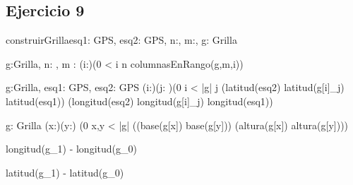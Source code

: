 \documentclass[a4paper]{article}
\begin{document}
\subsection*{Ejercicio 9}
\begin{proc}{construirGrilla}{\In esq1: GPS, \In esq2: GPS, \In n:\ent, \In m:\ent, \Out g: Grilla}{}
    
     {g:Grilla, n: \ent, m :\ent} {
		(\forall i:\ent)(0 < i \leq n \implicaLuego columnasEnRango(g,m,i))
    }
		
    
     {g:Grilla, esq1: GPS, esq2: GPS}{
		(\forall i:\ent)(\forall j: \ent)(0 \leq i < |g|  \leq j  \implicaLuego (latitud(esq2) \leq latitud(g[i]_j) \leq latitud(esq1)) \wedge (longitud(esq2) \leq longitud(g[i]_j) \leq longitud(esq1))
    }
    
     {g: Grilla} {
    (\forall x:\ent)\neg(\exists y:\ent) (0 \leq x,y < |g| \implicaLuego ((base(g[x]) \neq base(g[y])) \wedge (altura(g[x]) \neq altura(g[y])))
    }
    
	{longitud(g_1) - longitud(g_0)}
    
	{latitud(g_1) - latitud(g_0)}
    
\end{proc}
\end{document}
